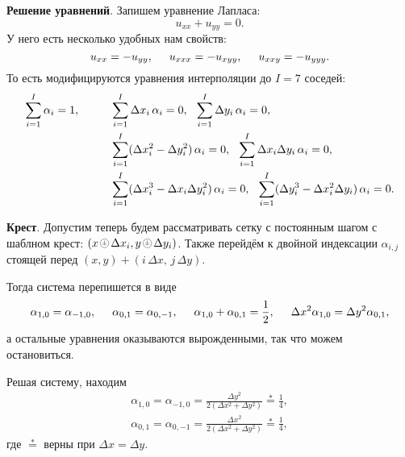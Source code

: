 \textbf{Решение уравнений}. Запишем уравнение Лапласа:
\begin{equation*}
	u_{xx} + u_{yy} = 0.
\end{equation*}
У него есть несколько удобных нам свойств:
\begin{equation*}
	u_{xx} = - u_{yy},
	\hspace{5 mm} 
	u_{xxx} = - u_{xyy},
	\hspace{5 mm} 
	u_{xxy} = - u_{yyy}.
\end{equation*}
То есть модифицируются уравнения интерполяции до $I = 7$ соседей:
\begin{align*}
	\sum_{i=1}^{I} \alpha_i = 1,
	\hspace{10 mm} 
	&\sum_{i=1}^{I} \Delta x_i \, \alpha_i = 0, 
	\hspace{2.5 mm} 
	\sum_{i=1}^{I} \Delta y_i \, \alpha_i = 0, \\
	&\sum_{i=1}^{I} (\Delta x_i^2-\Delta y_i^2) \, \alpha_i = 0,
	\hspace{2.5 mm} 
	\sum_{i=1}^{I} \Delta x_i \Delta y_i \, \alpha_i = 0, \\
	&\sum_{i=1}^{I} (\Delta x_i^3-\Delta x_i \Delta y_i^2) \, \alpha_i = 0,
	\hspace{2.5 mm} 
	\sum_{i=1}^{I} (\Delta y_i^3-\Delta x_i^2 \Delta y_i) \, \alpha_i = 0.
\end{align*}


\textbf{Крест}. 
Допустим теперь будем рассматривать сетку с постоянным шагом с шаблном крест: $(x \zpm \Delta x_i, y \zpm \Delta y_i)$. Также перейдём к двойной индексации $\alpha_{i, j}$ стоящей перед $(x, y) + (i\, \Delta x,\, j\, \Delta y)$.

Тогда система перепишется в виде
\begin{equation*}
	\alpha_{1,0} = \alpha_{-1,0},
	\hspace{5 mm} 
	\alpha_{0,1} = \alpha_{0, -1},
	\hspace{5 mm} 
	\alpha_{1,0} + \alpha_{0, 1} = \frac{1}{2},
	\hspace{5 mm} 
	\Delta x^2 \alpha_{1,0} = \Delta y^2 \alpha_{0,1},
\end{equation*}
а остальные уравнения оказываются вырожденными, так что можем остановиться. 


Решая систему, находим
\begin{align*}
	\alpha_{1,0} = \alpha_{-1,0} = \frac{\Delta y^2}{2 (\Delta x^2 + \Delta y^2)} \overset{*}{=}  \frac{1}{4}, \\
	\alpha_{0,1} = \alpha_{0,-1} = \frac{\Delta x^2}{2 (\Delta x^2 + \Delta y^2)}\overset{*}{=} \frac{1}{4},
\end{align*}
где $\overset{*}{=}$ верны при $\Delta x = \Delta y$. 

